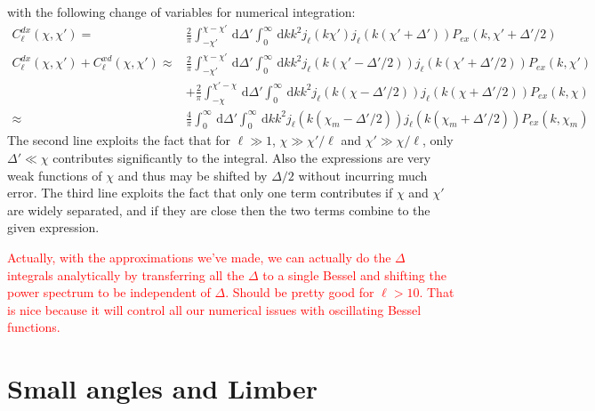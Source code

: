 \documentclass[onecolumn,prd,nofootinbib]{revtex4-1}
\newcommand{\ud}{\,\mathrm{d}}
\newcommand{\red}{\textcolor{red}}
\begin{document}
with the following change of variables for numerical integration:
\begin{align}
C^{dx}_\ell(\chi,\chi')
    =&
    \frac{2}{\pi}
    \int_{-\chi'}^{\chi - \chi'}\ud\Delta'
    \int_0^\infty\ud k k^2 j_\ell(k\chi')
    j_{\ell}(k(\chi'+\Delta'))
    P_{ex}(k, \chi' + \Delta'/2)
    \\
C^{dx}_\ell(\chi,\chi') + C^{xd}_\ell(\chi,\chi')
    \approx&
    \frac{2}{\pi}
    \int_{-\chi'}^{\chi - \chi'}\ud\Delta'
    \int_0^\infty\ud k k^2 j_\ell(k(\chi'-\Delta'/2))
    j_{\ell}(k(\chi'+\Delta'/2))
    P_{ex}(k, \chi')
    \nonumber\\
    &+
    \frac{2}{\pi}
    \int_{-\chi}^{\chi' - \chi}\ud\Delta'
    \int_0^\infty\ud k k^2 j_\ell(k(\chi-\Delta'/2))
    j_{\ell}(k(\chi+\Delta'/2))
    P_{ex}(k, \chi)\\
    \approx&
    \frac{4}{\pi}
    \int_{0}^{\infty}\ud\Delta'
    \int_0^\infty\ud k k^2 j_\ell(k(\chi_m-\Delta'/2))
    j_{\ell}(k(\chi_m+\Delta'/2))
    P_{ex}(k, \chi_m)
\end{align}
The second line exploits the fact that for $\ell \gg 1$, $\chi \gg \chi'/\ell$ and
$\chi' \gg \chi/\ell$, only $\Delta'\ll\chi$ contributes significantly to the
integral. Also the expressions are very weak functions of $\chi$ and thus
may be shifted by $\Delta/2$ without incurring much error. The third line
exploits the fact that only one term contributes if $\chi$ and $\chi'$ are
widely separated, and if they are close then the two terms combine to the given
expression.

\red{Actually, with the approximations we've made, we can actually do the
$\Delta$ integrals analytically by transferring all the $\Delta$ to a single
Bessel and shifting the power spectrum to be independent of $\Delta$.  Should
be pretty good for $\ell > 10$.  That is nice because it will control all our
numerical issues with oscillating Bessel functions.}


\section{Small angles and Limber}
\end{document}
